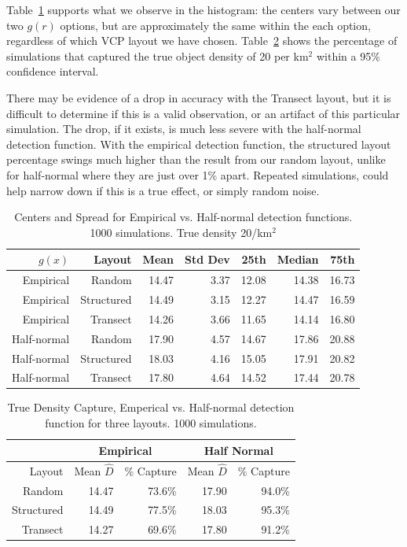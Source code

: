 \documentclass[12pt]{article}
\begin{document}
Table~\ref{table:sim1} supports what we observe in the histogram: the centers vary between our two $g(r)$ options, but are approximately the same within the each option, regardless of which VCP layout we have chosen. Table~\ref{table:sim1capture} shows the percentage of simulations that captured the true object density of 20 per km$^2$ within a 95\% confidence interval. \cite{quang1993}

There may be evidence of a drop in accuracy with the Transect layout, but it is difficult to determine if this is a valid observation, or an artifact of this particular simulation. The drop, if it exists, is much less severe with the half-normal detection function. With the empirical detection function, the structured layout percentage swings much higher than the result from our random layout, unlike for half-normal where they are just over 1\% apart. Repeated simulations, could help narrow down if this is a true effect, or simply random noise.
\begin{table}[h]

	\begin{tabular}{ r r |r r| r r r}
		$g(x)$      & Layout     & Mean  & Std Dev & 25th  & Median & 75th  \\ \hline\hline
		Empirical   & Random     & 14.47 & 3.37    & 12.08 & 14.38  & 16.73 \\
		Empirical   & Structured & 14.49 & 3.15    & 12.27 & 14.47  & 16.59 \\
		Empirical   & Transect   & 14.26 & 3.66    & 11.65 & 14.14  & 16.80 \\ \hline
		Half-normal & Random     & 17.90 & 4.57    & 14.67 & 17.86  & 20.88 \\
		Half-normal & Structured & 18.03 & 4.16    & 15.05 & 17.91  & 20.82 \\
		Half-normal & Transect   & 17.80 & 4.64    & 14.52 & 17.44  & 20.78
	\end{tabular}
	\caption{Centers and Spread for Empirical vs. Half-normal detection functions. 1000 simulations. True density 20/km$^2$}
	\label{table:sim1}
\end{table}
\begin{table}[h]

	\begin{tabular}{ r| r r| r r|}
		           & \multicolumn{2}{|c|}{Empirical} & \multicolumn{2}{|c|}{Half Normal} \\ \hline\hline
		Layout     & Mean $\hat{D}$ & \% Capture     & Mean $\hat{D}$ & \% Capture       \\ \hline\hline
		Random     & 14.47          & 73.6\%         & 17.90          & 94.0\%           \\
		Structured & 14.49          & 77.5\%         & 18.03          & 95.3\%           \\
		Transect   & 14.27          & 69.6\%         & 17.80          & 91.2\%           \\ \hline
	\end{tabular}
	\caption{True Density Capture, Emperical vs. Half-normal detection function for three layouts. 1000 simulations.}
	\label{table:sim1capture}
\end{table}
\end{document}
